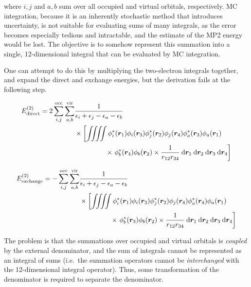 \noindent where $i,j$ and $a,b$ sum over all occupied and virtual orbitals,
respectively. MC integration, because it is an inherently stochastic method that
introduces uncertainty, is not suitable for evaluating sums of many integrals,
as the error becomes especially tedious and intractable, and the estimate of the
MP2 energy would be lost. The objective is to somehow represent this summation
into a single, 12-dimensional integral that can be evaluated by MC integration.

One can attempt to do this by multiplying the two-electron integrals together,
and expand the direct and exchange energies, but the derivation fails at the
following step.

\begin{equation}
\begin{split}
\perturbE[\text{direct}]{2}
= 2 \sum_{i,j}^{\text{occ}} \sum_{a,b}^{\text{vir}}
   &\frac{1}{\eps_i + \eps_j - \eps_a - \eps_b} \\
   &\times \left[ \iiiint \phi_i^*(\bm r_1) \phi_i(\bm r_3) \phi_j^*(\bm r_2) \phi_j(\bm r_4) \phi_a^*(\bm r_3) \phi_a(\bm r_1) \right. \\
   &\qquad\qquad\;\; \times \left. \phi_b^*(\bm r_4) \phi_b(\bm r_2) \times \frac{1}{r_{12}r_{34}} \dif \bm r_1 \dif \bm r_2 \dif \bm r_3 \dif \bm r_4 \right]
\end{split}
\end{equation}

\begin{equation}
\begin{split}
\perturbE[\text{exchange}]{2}
= - \sum_{i,j}^{\text{occ}} \sum_{a,b}^{\text{vir}}
   &\frac{1}{\eps_i + \eps_j - \eps_a - \eps_b} \\
   &\times \left[ \iiiint \phi_i^*(\bm r_1) \phi_i(\bm r_3) \phi_j^*(\bm r_2) \phi_j(\bm r_4) \phi_a^*(\bm r_4) \phi_a(\bm r_1) \right. \\
   &\qquad\qquad\;\; \times \left. \phi_b^*(\bm r_3) \phi_b(\bm r_2) \times \frac{1}{r_{12}r_{34}} \dif \bm r_1 \dif \bm r_2 \dif \bm r_3 \dif \bm r_4 \right]
\end{split}
\end{equation}

\noindent The problem is that the summations over occupied and virtual orbitals
is \emph{coupled} by the external denominator, and the sum of integrals cannot
be represented as an integral of sums (i.e.\ the summation operators cannot be
\emph{interchanged} with the 12-dimensional integral operator). Thus, some
transformation of the denominator is required to separate the denominator.

